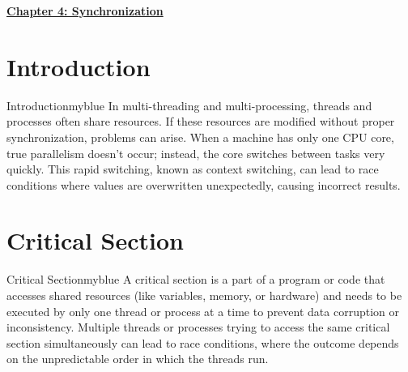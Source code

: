 \newpage
\null
\vspace{0.15cm}

\begin{center}
    \Huge{\textbf{\underline{Chapter 4: Synchronization}}}
\end{center}

\vspace{0.25cm}

\setcounter{section}{0}

\section{Introduction}
\begin{prettyBox}{Introduction}{myblue}
In multi-threading and multi-processing, threads and processes often share resources.
If these resources are modified without proper synchronization, problems can arise. 
When a machine has only one CPU core, true parallelism doesn't occur; instead, the core
switches between tasks very quickly. This rapid switching, known as context switching, 
can lead to race conditions where values are overwritten unexpectedly,
causing incorrect results.
\end{prettyBox}

\vspace{0.35cm}

\section{Critical Section}
\begin{prettyBox}{Critical Section}{myblue}
A critical section is a part of a program or code that accesses shared resources
(like variables, memory, or hardware) and needs to be executed by only one thread or 
process at a time to prevent data corruption or inconsistency. Multiple threads or 
processes trying to access the same critical section simultaneously can lead 
to race conditions, where the outcome depends on the unpredictable order in which the threads run.
\end{prettyBox}

\vspace{0.35cm}

